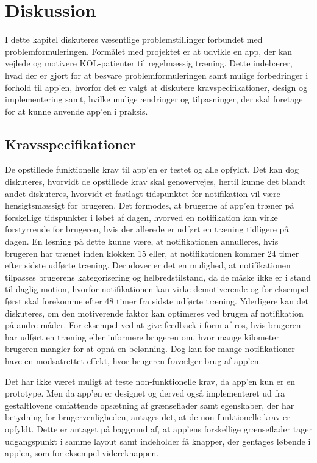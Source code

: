 \section{Diskussion}
I dette kapitel diskuteres væsentlige problemstillinger forbundet med problemformuleringen. Formålet med projektet er at udvikle en app, der kan vejlede og motivere KOL-patienter til regelmæssig træning. Dette indebærer, hvad der er gjort for at besvare problemformuleringen samt mulige forbedringer i forhold til app'en, hvorfor det er valgt at diskutere kravspecifikationer, design og implementering samt, hvilke mulige ændringer og tilpasninger, der skal foretage for at kunne anvende  app’en i praksis.

\subsection{Kravsspecifikationer}
De opstillede funktionelle krav til app’en er testet og alle opfyldt. Det kan dog diskuteres, hvorvidt de opstillede krav skal genovervejes, hertil kunne det blandt andet diskuteres, hvorvidt et fastlagt tidspunktet for notifikation vil være hensigtsmæssigt for brugeren. Det formodes, at brugerne af app’en træner på forskellige tidspunkter i løbet af dagen, hvorved en notifikation kan virke forstyrrende for brugeren, hvis der allerede er udført en træning tidligere på dagen. En løsning på dette kunne være, at notifikationen annulleres, hvis brugeren har trænet inden klokken 15 eller, at notifikationen kommer 24 timer efter sidste udførte træning. Derudover er det en mulighed, at notifikationen tilpasses brugerens kategorisering og helbredstilstand, da de måske ikke er i stand til daglig motion, hvorfor notifikationen kan virke demotiverende og for eksempel først skal forekomme efter 48 timer fra sidste udførte træning. Yderligere kan det diskuteres, om den motiverende faktor kan optimeres ved brugen af notifikation på andre måder. For eksempel ved at give feedback i form af ros, hvis brugeren har udført en træning eller informere brugeren om, hvor mange kilometer brugeren mangler for at opnå en belønning. Dog kan for mange notifikationer have en modsatrettet effekt, hvor brugeren fravælger brug af app’en. 

Det har ikke været muligt at teste non-funktionelle krav, da app’en kun er en prototype. Men da app’en er designet og derved også implementeret ud fra gestaltlovene omfattende opsætning af grænseflader samt egenskaber, der har betydning for brugervenligheden, antages det, at de non-funktionelle krav er opfyldt. Dette er antaget på baggrund af, at app'ens forskellige grænseflader tager udgangspunkt i samme layout samt indeholder få knapper, der gentages løbende i app’en, som for eksempel videreknappen. 

